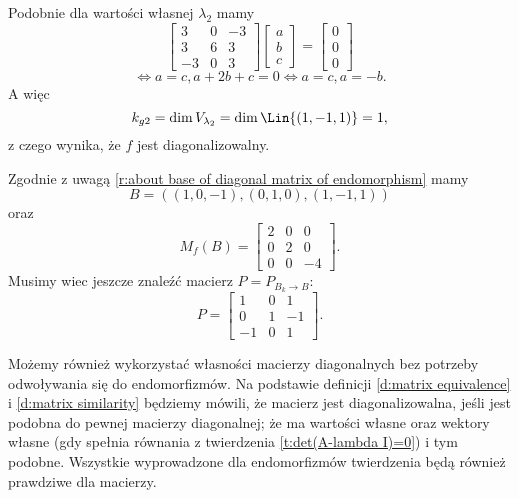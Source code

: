 \begin{solution}
    Podobnie dla wartości własnej $\lambda_2$ mamy
    \[ \begin{bmatrix}
        3 & 0 & -3 \\
        3 & 6 & 3 \\
        -3 & 0 & 3
    \end{bmatrix}\begin{bmatrix}
        a \\ b \\ c
    \end{bmatrix} = \begin{bmatrix}
        0 \\ 0 \\ 0
    \end{bmatrix} \]
    \[ \iff a = c, a + 2b + c = 0 \iff a = c, a = -b. \]
    A więc
    \[ k_{g2} = \dim V_{\lambda_2} = \dim\Lin\{(1, -1, 1)\} = 1, \]
    z czego wynika, że $f$ jest diagonalizowalny.

    Zgodnie z uwagą \ref{r:about base of diagonal matrix of endomorphism} mamy
    \[ B = ((1, 0, -1), (0, 1, 0), (1, -1, 1)) \]
    oraz
    \[ M_f(B) = \begin{bmatrix}
        2 & 0 & 0 \\
        0 & 2 & 0 \\
        0 & 0 & -4
    \end{bmatrix}. \]
    Musimy wiec jeszcze znaleźć macierz $P = P_{B_k\to B}$:
    \[ P = \begin{bmatrix}
        1 & 0 & 1 \\
        0 & 1 & -1 \\
        -1 & 0 & 1
    \end{bmatrix}. \]
\end{solution}

Możemy również wykorzystać własności macierzy diagonalnych bez potrzeby odwoływania się do endomorfizmów. Na podstawie definicji \ref{d:matrix equivalence} i \ref{d:matrix similarity} będziemy mówili, że macierz jest diagonalizowalna, jeśli jest podobna do pewnej macierzy diagonalnej; że ma wartości własne oraz wektory własne (gdy spełnia równania z twierdzenia \ref{t:det(A-lambda I)=0}) i tym podobne. Wszystkie wyprowadzone dla endomorfizmów twierdzenia będą również prawdziwe dla macierzy.

